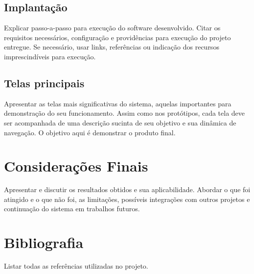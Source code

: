 \documentclass[a4paper,12pt]{article}
\begin{document}
\subsection{Implantação}
Explicar passo-a-passo para execução do software desenvolvido. Citar os requisitos necessários, configuração e providências para execução do projeto entregue. Se necessário, usar links, referências ou indicação dos recursos imprescindíveis para execução.

\subsection{Telas principais}
Apresentar as telas mais significativas do sistema, aquelas importantes para demonstração do seu funcionamento. Assim como nos protótipos, cada tela deve ser acompanhada de uma descrição sucinta de seu objetivo e sua dinâmica de navegação. O objetivo aqui é demonstrar o produto final.

\newpage
\section{Considerações Finais}
Apresentar e discutir os resultados obtidos e sua aplicabilidade. Abordar o que foi atingido e o que não foi, as limitações, possíveis integrações com outros projetos e continuação do sistema em trabalhos futuros.

\newpage
\section{Bibliografia}

Listar todas as referências utilizadas no projeto.
\end{document}
